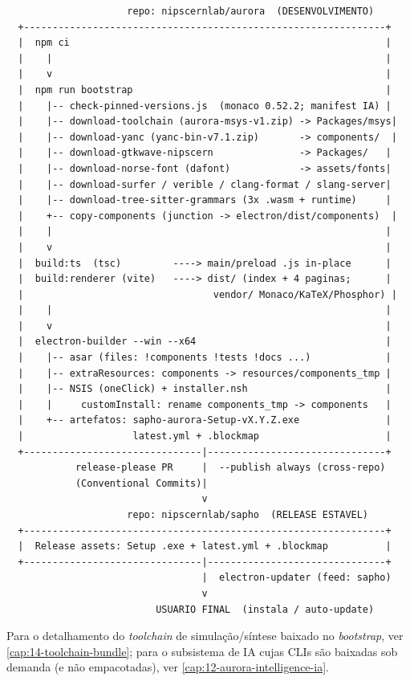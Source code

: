 \begin{lstlisting}
                     repo: nipscernlab/aurora  (DESENVOLVIMENTO)
  +---------------------------------------------------------------+
  |  npm ci                                                       |
  |    |                                                          |
  |    v                                                          |
  |  npm run bootstrap                                            |
  |    |-- check-pinned-versions.js  (monaco 0.52.2; manifest IA) |
  |    |-- download-toolchain (aurora-msys-v1.zip) -> Packages/msys|
  |    |-- download-yanc (yanc-bin-v7.1.zip)       -> components/  |
  |    |-- download-gtkwave-nipscern               -> Packages/   |
  |    |-- download-norse-font (dafont)            -> assets/fonts|
  |    |-- download-surfer / verible / clang-format / slang-server|
  |    |-- download-tree-sitter-grammars (3x .wasm + runtime)     |
  |    +-- copy-components (junction -> electron/dist/components)  |
  |    |                                                          |
  |    v                                                          |
  |  build:ts  (tsc)         ----> main/preload .js in-place      |
  |  build:renderer (vite)   ----> dist/ (index + 4 paginas;      |
  |                                 vendor/ Monaco/KaTeX/Phosphor) |
  |    |                                                          |
  |    v                                                          |
  |  electron-builder --win --x64                                 |
  |    |-- asar (files: !components !tests !docs ...)             |
  |    |-- extraResources: components -> resources/components_tmp |
  |    |-- NSIS (oneClick) + installer.nsh                        |
  |    |     customInstall: rename components_tmp -> components   |
  |    +-- artefatos: sapho-aurora-Setup-vX.Y.Z.exe               |
  |                   latest.yml + .blockmap                      |
  +-------------------------------|-------------------------------+
            release-please PR     |  --publish always (cross-repo)
            (Conventional Commits)|
                                  v
                     repo: nipscernlab/sapho  (RELEASE ESTAVEL)
  +---------------------------------------------------------------+
  |  Release assets: Setup .exe + latest.yml + .blockmap          |
  +-------------------------------|-------------------------------+
                                  |  electron-updater (feed: sapho)
                                  v
                          USUARIO FINAL  (instala / auto-update)
\end{lstlisting}

\noindent
Para o detalhamento do \emph{toolchain} de simulação/síntese baixado no
\emph{bootstrap}, ver \autoref{cap:14-toolchain-bundle}; para o subsistema de IA
cujas CLIs são baixadas sob demanda (e não empacotadas), ver
\autoref{cap:12-aurora-intelligence-ia}.
